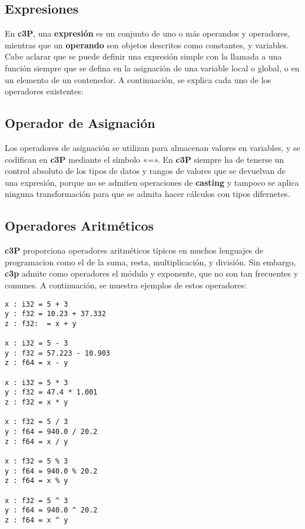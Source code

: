 \subsection{Expresiones}

En \textbf{c3P}, una \textbf{expresión} es un conjunto de uno o más operandos y operadores, mientras
que un \textbf{operando} son objetos descritos como constantes, y variables. Cabe aclarar que se
puede definir una expresión simple con la llamada a una función siempre que se defina en la asignación
de una variable local o global, o en un elemento de un contenedor. A continuación, se explica cada uno
de los operadores existentes:

\subsection{Operador de Asignación}

Los operadores de asignación se utilizan para almacenan valores en variables, y se codifican
en \textbf{c3P} mediante el símbolo «=». En \textbf{c3P} siempre ha de tenerse un control
absoluto de los tipos de datos y rangos de valores que se devuelvan de una expresión, porque
no se admiten operaciones de \textbf{casting} y tampoco se aplica ninguna transformación
para que se admita hacer cálculos con tipos difernetes.

\subsection{Operadores Aritméticos}

\textbf{c3P} proporciona operadores aritméticos típicos en muchos lenguajes de programacion como
el de la suma, resta, multiplicación, y división. Sin embargo, \textbf{c3p} admite como operadores
el módulo y exponente, que no son tan frecuentes y comunes. A continuación, se muestra ejemplos de
estos operadores:

\begin{verbatim}
x : i32 = 5 + 3
y : f32 = 10.23 + 37.332
z : f32:  = x + y

x : i32 = 5 - 3
y : f32 = 57.223 - 10.903
z : f64 = x - y

x : i32 = 5 * 3
y : f32 = 47.4 * 1.001
z : f32 = x * y

x : f32 = 5 / 3
y : f64 = 940.0 / 20.2
z : f64 = x / y

x : f32 = 5 % 3
y : f64 = 940.0 % 20.2
z : f64 = x % y

x : f32 = 5 ^ 3
y : f64 = 940.0 ^ 20.2
z : f64 = x ^ y
\end{verbatim}

